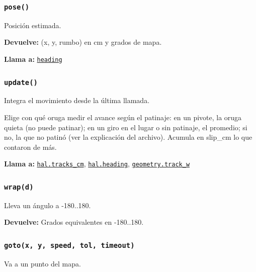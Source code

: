 \subsubsection{\texttt{pose()}}\label{fn:odometry:pose}
\noindent Posición estimada.

\noindent\textbf{Devuelve:} (x, y, rumbo) en cm y grados de mapa.\par
\noindent\textbf{Llama a:} \hyperref[fn:odometry:heading]{\texttt{heading}}\par

\subsubsection{\texttt{update()}}\label{fn:odometry:update}
\noindent Integra el movimiento desde la última llamada.

Elige con qué oruga medir el avance según el patinaje: en un pivote, la oruga quieta (no puede patinar); en un giro en el lugar o sin patinaje, el promedio; si no, la que no patinó (ver la explicación del archivo). Acumula en slip\_cm lo que contaron de más.

\noindent\textbf{Llama a:} \hyperref[fn:hal:tracks-cm]{\texttt{hal.tracks\_\allowbreak{}cm}}, \hyperref[fn:hal:heading]{\texttt{hal.heading}}, \hyperref[fn:geometry:track-w]{\texttt{geometry.track\_\allowbreak{}w}}\par

\subsubsection{\texttt{wrap(d)}}\label{fn:odometry:wrap}
\noindent Lleva un ángulo a -180..180.

\par{}\par\smallskip
\noindent\textbf{Devuelve:} Grados equivalentes en -180..180.\par

\subsubsection{\texttt{goto(x, y, speed, tol, timeout)}}\label{fn:odometry:goto}
\noindent Va a un punto del mapa.

